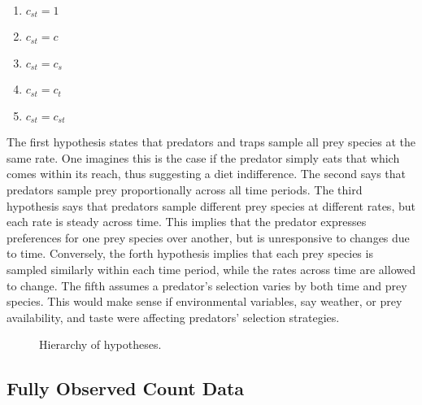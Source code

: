 \begin{enumerate}
\item $c_{st} = 1$
\item $c_{st} = c$
\item $c_{st} = c_s$
\item $c_{st} = c_t$
\item $c_{st} = c_{st}$
\end{enumerate}

The first hypothesis states that predators and traps sample all prey species at the same rate.  One imagines this is the case if the predator simply eats that which comes within its reach, thus suggesting a diet indifference.  The second says that predators sample prey proportionally across all time periods.  The third hypothesis says that predators sample different prey species at different rates, but each rate is steady across time.  This implies that the predator expresses preferences for one prey species over another, but is unresponsive to changes due to time.  Conversely, the forth hypothesis implies that each prey species is sampled similarly within each time period, while the rates across time are allowed to change.  The fifth assumes a predator's selection varies by both time and prey species.  This would make sense if environmental variables, say weather, or prey availability, and taste were affecting predators' selection strategies.  

\begin{figure}
  \centering
  
  \caption{Hierarchy of hypotheses.}
  \label{fig:hier}
\end{figure}

\subsection{Fully Observed Count Data}
\label{sec:count}

